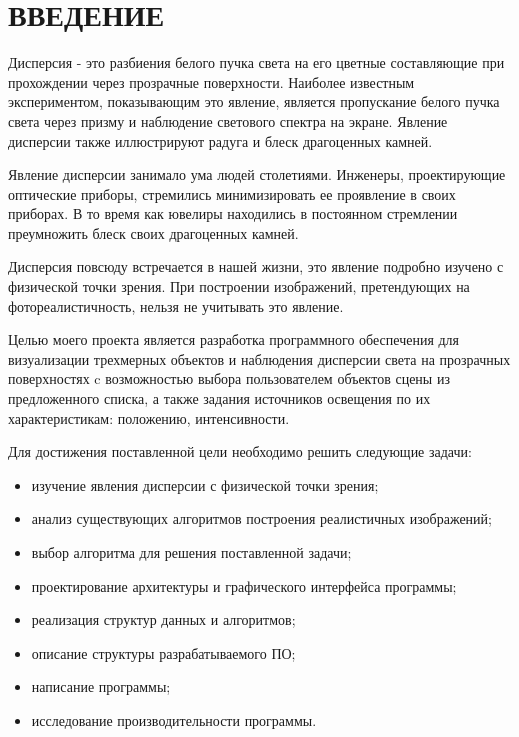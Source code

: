 \chapter*{ВВЕДЕНИЕ}

    Дисперсия - это разбиения белого пучка света на его цветные составляющие при прохождении через прозрачные поверхности. Наиболее известным экспериментом, показывающим это явление, является пропускание белого пучка света через призму и наблюдение светового спектра на экране. Явление дисперсии также иллюстрируют радуга и блеск драгоценных камней.

    Явление дисперсии занимало ума людей столетиями. Инженеры, проектирующие оптические приборы, стремились минимизировать ее проявление в своих приборах. В то время как ювелиры находились в постоянном стремлении преумножить блеск своих драгоценных камней.

    Дисперсия повсюду встречается в нашей жизни, это явление подробно изучено с физической точки зрения. При построении изображений, претендующих на фотореалистичность, нельзя не учитывать это явление.


    Целью моего проекта является разработка программного обеспечения для визуализации трехмерных объектов и наблюдения дисперсии света на прозрачных поверхностях c возможностью выбора пользователем объектов сцены из предложенного списка, а также задания источников освещения по их характеристикам: положению, интенсивности.

    Для достижения поставленной цели необходимо решить следующие задачи:

    \begin{itemize}
        \item изучение явления дисперсии с физической точки зрения;
        \item анализ существующих алгоритмов построения реалистичных изображений;
        \item выбор алгоритма для решения поставленной задачи;
        \item проектирование архитектуры и графического интерфейса программы;
        \item реализация структур данных и алгоритмов;
	    \item описание структуры разрабатываемого ПО;
	    \item написание программы;
        \item исследование производительности программы.
    \end{itemize}
